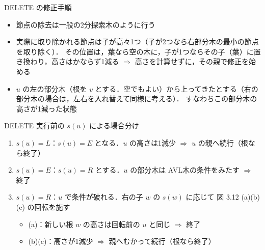 \documentclass[aspectratio=169,11pt]{beamer}
\begin{document}
\begin{frame}{DELETE の修正手順}
  \begin{itemize}
    \item 節点の除去は一般の2分探索木のように行う
    \item 実際に取り除かれる節点は子が高々1つ（子が2つなら右部分木の最小の節点を取り除く）．
          その位置は，葉なら空の木に，子が1つならその子（葉）に置き換わり，\alert{高さはかならず1減る}
          $\Rightarrow$ 高さを計算せずに，その親で修正を始める
    \item $u$ の左の部分木（根を $v$ とする．空でもよい）から上ってきたとする（右の部分木の場合は，左右を入れ替えて同様に考える）．
          すなわちこの部分木の高さが1減った状態
  \end{itemize}
  \begin{block}{DELETE 実行前の $s(u)$ による場合分け}
    \begin{enumerate}
      \item $s(u)=L$：$s(u)=E$ となる．$u$ の高さは1減少 $\Rightarrow$ $u$ の親へ\alert{続行}（根なら終了）
      \item $s(u)=E$：$s(u)=R$ とする．$u$ の部分木は AVL木の条件をみたす $\Rightarrow$ \alert{終了}
      \item $s(u)=R$：$u$ で条件が破れる．右の子 $w$ の $s(w)$ に応じて
            図 3.12 (a)(b)(c) の\alert{回転}を施す
            \begin{itemize}
              \item (a)：新しい根 $w$ の高さは回転前の $u$ と同じ $\Rightarrow$ \alert{終了}
              \item (b)(c)：高さが1減少 $\Rightarrow$ 親へむかって\alert{続行}（根なら終了）
            \end{itemize}
    \end{enumerate}
  \end{block}
\end{frame}
\end{document}
